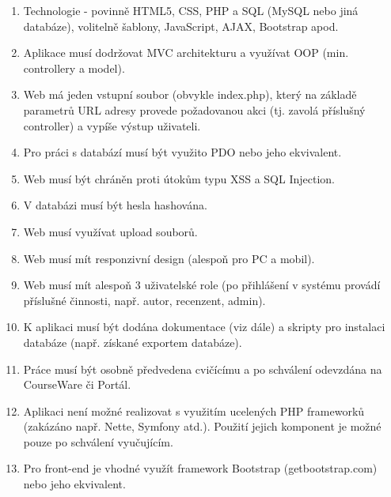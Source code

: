 \documentclass[12pt, a4paper]{report}
\begin{document}
\begin{enumerate}[left=1cm] %
\item Technologie - povinně HTML5, CSS, PHP a SQL (MySQL nebo jiná databáze), volitelně šablony, JavaScript, AJAX, Bootstrap apod.
\item Aplikace musí dodržovat MVC architekturu a využívat OOP (min. controllery a model).
\item Web má jeden vstupní soubor (obvykle index.php), který na základě parametrů URL adresy provede požadovanou akci (tj. zavolá příslušný controller) a vypíše výstup uživateli.
\item Pro práci s databází musí být využito PDO nebo jeho ekvivalent.
\item Web musí být chráněn proti útokům typu XSS a SQL Injection.
\item V databázi musí být hesla hashována.
\item Web musí využívat upload souborů.
\item Web musí mít responzivní design (alespoň pro PC a mobil).
\item Web musí mít alespoň 3 uživatelské role (po přihlášení v systému provádí příslušné činnosti, např. autor, recenzent, admin).
\item K aplikaci musí být dodána dokumentace (viz dále) a skripty pro instalaci databáze (např. získané exportem databáze).
\item Práce musí být osobně předvedena cvičícímu a po schválení odevzdána na CourseWare či Portál.
\item Aplikaci není možné realizovat s využitím ucelených PHP frameworků (zakázáno např. Nette, Symfony atd.). Použití jejich komponent je možné pouze po schválení vyučujícím.
\item Pro front-end je vhodné využít framework Bootstrap (getbootstrap.com) nebo jeho ekvivalent.


\end{enumerate}
\end{document}
